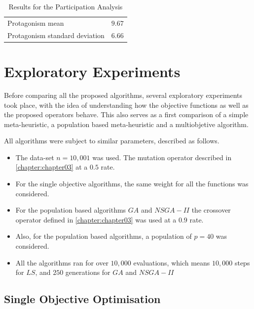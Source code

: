 \begin{table}[]
    \centering
    \begin{tabular}{ll}
    \hline
    Protagonism mean               & $9.67$ \\
    Protagonism standard deviation & $6.66$ \\
    \hline
    \end{tabular}
    \caption{Results for the Participation Analysis}
    \label{table:participation_results}
\end{table}

\section{Exploratory Experiments}

Before comparing all the proposed algorithms, several exploratory experiments took place, with the idea of understanding how the objective functions as well as the proposed operators behave. This also serves as a first comparison of a simple meta-heuristic, a population based meta-heuristic and a multiobjetive algorithm. 

All algorithms were subject to similar parameters, described as follows.

\begin{itemize}
    \item The data-set $n=10,001$ was used. The mutation operator described in \ref{chapter:chapter03} at a $0.5$ rate.

    \item For the single objective algorithms, the same weight for all the functions was considered.
    
    \item For the population based algorithms $GA$ and $NSGA-II$ the crossover operator defined in \ref{chapter:chapter03} was used at a $0.9$ rate.

    \item Also, for the population based algorithms, a population of $p=40$ was considered. 
    
    \item All the algorithms ran for over $10,000$ evaluations, which means $10,000$ steps for $LS$, and $250$ generations for $GA$ and $NSGA-II$
\end{itemize}

\subsection{Single Objective Optimisation}

